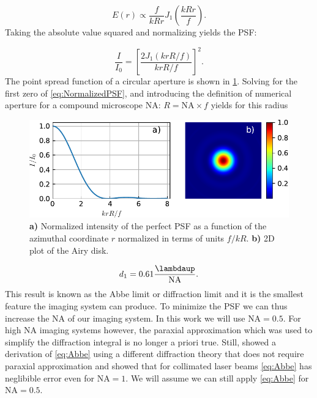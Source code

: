\begin{equation}\label{eq:AiryField}
    E(r) \propto \frac{f}{kRr} J_1\left(\frac{k R r}{f}\right).
\end{equation}
Taking the absolute value squared and normalizing yields the \ac{PSF}:

\begin{equation}\label{eq:NormalizedPSF}
    \frac{I}{I_0} = \left[
    \frac{2J_1(k r R/f)}{k r R/f}
    \right]^2.
\end{equation}
The point spread function of a circular aperture is shown in \cref{fig:AiryPlots}. 
Solving for the first zero of \cref{eq:NormalizedPSF}, and introducing the definition of numerical aperture for a compound microscope \ac{NA}: $R = \text{NA} \times f$ yields for this radius 
\begin{figure}
    \centering
    \includegraphics[width = 0.9\linewidth]{figures/AiryDisk.pdf}
    \caption{\textbf{a)} Normalized intensity of the perfect \ac{PSF} as a function of the azimuthal coordinate $r$ normalized in terms of units $f / kR$.
    \textbf{b) }2D plot of the Airy disk.  }
    \label{fig:AiryPlots}
\end{figure}

\begin{equation}\label{eq:Abbe}
    d_1 = 0.61 \frac{\lambdaup}{\text{NA}}.
\end{equation}
This result is known as the Abbe limit or diffraction limit \cite{Abbe1882} and it is the smallest feature the imaging system can produce. 
To minimize the \ac{PSF} we can thus increase the \ac{NA} of our imaging system. In this work we will use $\text{NA} = 0.5$. 
For high NA imaging systems however, the paraxial approximation which was used to simplify the diffraction integral is no longer a priori true. 
Still, \cite{Chon2007} showed a derivation of \cref{eq:Abbe} using a different diffraction theory that does not require paraxial approximation and showed that for collimated laser beams \cref{eq:Abbe} has neglibible error even for $\text{NA} = 1$. 
We will assume we can still apply \cref{eq:Abbe} for $\text{NA} = 0.5$.

